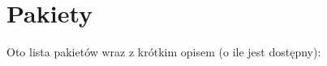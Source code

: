 \section{Pakiety}
Oto lista pakietów wraz z krótkim opisem (o ile jest dostępny)\+:\begin{DoxyCompactList}
\item{}
\end{DoxyCompactList}
